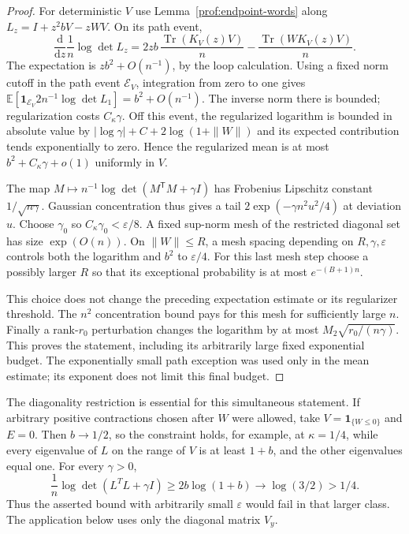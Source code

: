 \begin{proof}
For deterministic $V$ use Lemma~\ref{prof:endpoint-words} along
$L_z=I+z^2bV-zWV$.  On its path event,
\[
 \frac{\mathrm d}{\mathrm dz}\frac1n\log\det L_z
 =2zb\,\frac{\operatorname{Tr}(K_V(z)V)}n
       -\frac{\operatorname{Tr}(WK_V(z)V)}n.
\]
The expectation is $zb^2+O(n^{-1})$, by the loop calculation.
Using a fixed norm cutoff in the path event $\mathcal E_V$, integration
from zero to one gives
$\mathbb E[\mathbf1_{\mathcal E_V}2n^{-1}\log\det L_1]
=b^2+O(n^{-1})$.  The inverse norm there is bounded; regularization costs
$C_\kappa\gamma$.  Off this event, the regularized logarithm is bounded
in absolute value by $|\log\gamma|+C+2\log(1+\|W\|)$ and its expected
contribution tends exponentially to zero.  Hence the regularized mean
is at most $b^2+C_\kappa\gamma+o(1)$ uniformly in $V$.

The map $M\mapsto n^{-1}\log\det(M^{\mathsf T}M+\gamma I)$ has
Frobenius Lipschitz constant $1/\sqrt{n\gamma}$.  Gaussian
concentration thus gives a tail $2\exp(-\gamma n^2u^2/4)$ at deviation
$u$.  Choose $\gamma_0$ so $C_\kappa\gamma_0<\varepsilon/8$.
A fixed sup-norm mesh of the restricted diagonal set has size
$\exp(O(n))$.  On $\|W\|\le R$, a mesh spacing depending on
$R,\gamma,\varepsilon$ controls both the logarithm and $b^2$ to
$\varepsilon/4$.  For this last mesh step choose a possibly larger $R$ so that its
exceptional probability is at most $e^{-(B+1)n}$.

This choice does not
change the preceding expectation estimate or its regularizer threshold.  The $n^2$ concentration bound
pays for this mesh for sufficiently large $n$.  Finally a rank-$r_0$
perturbation changes the logarithm by at most
$M_2\sqrt{r_0/(n\gamma)}$.  This proves the statement, including its
arbitrarily large fixed exponential budget.  The exponentially small
path exception was used only in the mean estimate; its exponent does
not limit this final budget.
\end{proof}

The diagonality restriction is essential for this simultaneous
statement. If arbitrary positive contractions chosen after \(W\)
were allowed, take \(V=\mathbf1_{\{W\le0\}}\) and \(E=0\).
Then \(b\to1/2\), so the constraint holds, for example, at
\(\kappa=1/4\), while every eigenvalue of \(L\) on the
range of \(V\) is at least \(1+b\), and the other eigenvalues
equal one. For every \(\gamma>0\),
\[
 \frac1n\log\det(L^TL+\gamma I)
 \ge2b\log(1+b)\longrightarrow\log(3/2)>1/4.
\]
Thus the asserted bound with arbitrarily small \(\varepsilon\)
would fail in that larger class. The application below uses only
the diagonal matrix \(V_y\).


